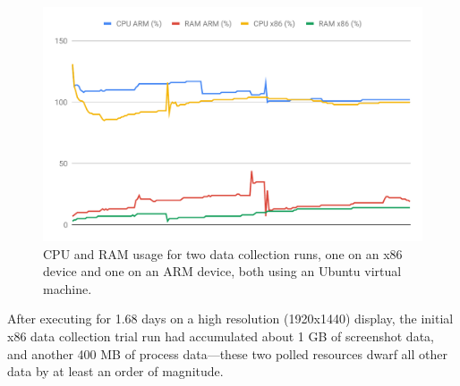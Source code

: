 \begin{figure}[t]
\includegraphics[width=\columnwidth]{datacollectionperformance.pdf}
\caption{CPU and RAM usage for two data collection runs, one on an x86 device and one on an ARM device, both using an Ubuntu virtual machine.}
\label{fig:datacollectionperformance}
\end{figure}

After executing for 1.68 days on a high resolution (1920x1440) display, the initial x86 data collection trial run had accumulated about 1 GB of screenshot data, and another 400 MB of process data---these two polled resources dwarf all other data by at least an order of magnitude.





